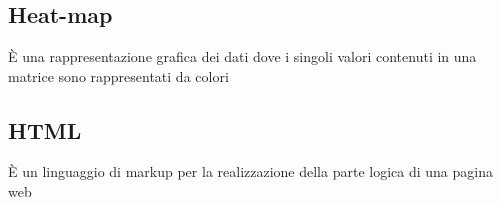 \section{}
\subsection*{Heat-map} È una rappresentazione grafica dei dati dove i singoli valori contenuti in una matrice sono rappresentati da colori
\subsection*{HTML} È un linguaggio di markup per la realizzazione della parte logica di una pagina web